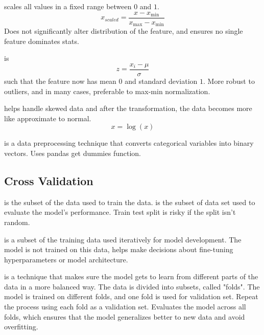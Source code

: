 \documentclass[12pt]{scrartcl}
\begin{document}
\begin{definition}
   scales all values in a fixed range between $0$ and $1$. 
  \[x_{scaled} = \frac{x-x_{\min}}{x_{\max} - x_{\min}}\]
  Does not significantly alter distribution of the feature, and ensures no single feature dominates stats.
\end{definition}

\begin{definition}
   is 
  \[z = \frac{x_i - \mu}{\sigma}\]
  such that the feature now has mean $0$ and standard deviation $1$. More robust to 
  outliers, and in many cases, preferable to max-min normalization.
\end{definition}

\begin{definition}
   helps handle skewed data and after the transformation, the data
  becomes more like approximate to normal.
  \[x = \log(x)\]
\end{definition}

\begin{definition}
   is a data preprocessing technique that converts categorical variables
  into binary vectors. Uses pandas get dummies function.
\end{definition}

\subsection{Cross Validation}

\begin{definition}
   is the subset of the data used to train the data. 
  is the subset of data set used to evaluate the model's performance. Train test split is risky if the 
  split isn't random. 
\end{definition}

\begin{definition}
   is a subset of the training data used iteratively for model development.
  The model is not trained on this data, helps make decisions about fine-tuning hyperparameters
  or model architecture.
\end{definition}

\begin{definition}
   is a technique that makes sure the model gets to learn from 
  different parts of the data in a more balanced way. The data is divided into subsets, called
  "folds". The model is trained on different folds, and one fold is used for validation set. 
  Repeat the process using each fold as a validation set. Evaluates the model across all folds, which ensures 
  that the model generalizes better to new data and avoid overfitting.
\end{definition}
\end{document}
